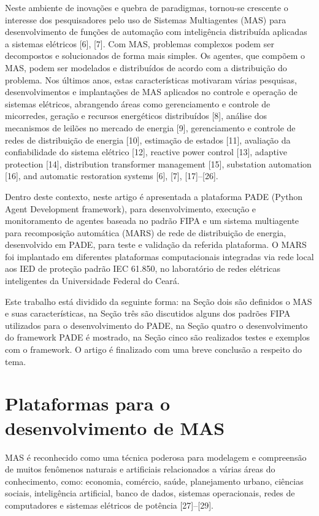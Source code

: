 \documentclass[journal]{IEEEtran}
\begin{document}
Neste ambiente de inovações e quebra de paradigmas, tornou-se crescente o interesse dos pesquisadores pelo uso de Sistemas Multiagentes (MAS) para desenvolvimento de funções de automação com inteligência distribuída aplicadas a sistemas elétricos [6], [7]. Com MAS, problemas complexos podem ser decompostos e solucionados de forma mais simples. Os agentes, que compõem o MAS, podem ser modelados e distribuídos de acordo com a distribuição do problema. Nos últimos anos, estas características motivaram várias pesquisas, desenvolvimentos e implantações de MAS aplicados no controle e operação de sistemas elétricos, abrangendo áreas como gerenciamento e controle de micorredes, geração e recursos energéticos distribuídos [8], análise dos mecanismos de leilões no mercado de energia [9], gerenciamento e controle de redes de distribuição de energia [10], estimação de estados [11], avaliação da confiabilidade do sistema elétrico [12], reactive power control [13], adaptive protection [14], distribution transformer management [15], substation automation [16], and automatic restoration systems [6], [7], [17]–[26]. 

Dentro deste contexto, neste artigo é apresentada a plataforma PADE (Python Agent Development framework), para desenvolvimento, execução e monitoramento de agentes baseada no padrão FIPA e um sistema multiagente para recomposição automática (MARS) de rede de distribuição de energia, desenvolvido em PADE, para teste e validação da referida plataforma. O MARS foi implantado em diferentes plataformas computacionais integradas via rede local aos IED de proteção padrão IEC 61.850, no laboratório de redes elétricas inteligentes da Universidade Federal do Ceará.

Este trabalho está dividido da seguinte forma: na Seção dois são definidos o MAS e suas características, na Seção três são discutidos alguns dos padrões FIPA utilizados para o desenvolvimento do PADE, na Seção quatro o desenvolvimento do framework PADE é mostrado, na Seção cinco são realizados testes e exemplos com o framework. O artigo é finalizado com uma breve conclusão a respeito do tema.

\section{Plataformas para o desenvolvimento de MAS}

MAS é reconhecido como uma técnica poderosa para modelagem e compreensão de muitos fenômenos naturais e artificiais relacionados a várias áreas do conhecimento, como: economia, comércio, saúde, planejamento urbano, ciências sociais, inteligência artificial, banco de dados, sistemas operacionais, redes de computadores e sistemas elétricos de potência [27]–[29].
\end{document}
